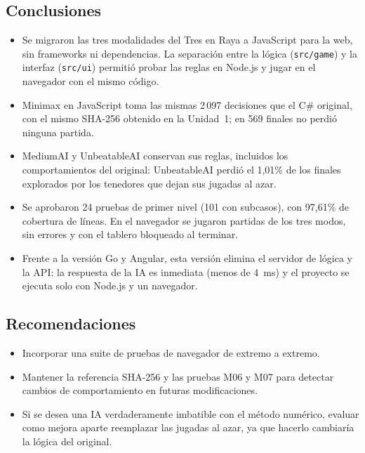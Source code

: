\documentclass[12pt,a4paper]{article}
\begin{document}
\subsection{Conclusiones}
\begin{itemize}
 \item Se migraron las tres modalidades del Tres en Raya a JavaScript para la web,
       sin frameworks ni dependencias. La separación entre la lógica
       (\texttt{src/game}) y la interfaz (\texttt{src/ui}) permitió probar las
       reglas en Node.js y jugar en el navegador con el mismo código.
 \item Minimax en JavaScript toma las mismas 2\,097 decisiones que el C\# original,
       con el mismo SHA-256 obtenido en la Unidad~1; en 569 finales no perdió ninguna partida.
 \item MediumAI y UnbeatableAI conservan sus reglas, incluidos los comportamientos
       del original: UnbeatableAI perdió el 1,01\% de los finales explorados por
       los tenedores que dejan sus jugadas al azar.
 \item Se aprobaron 24 pruebas de primer nivel (101 con subcasos), con 97,61\% de
       cobertura de líneas. En el navegador se jugaron partidas de los tres modos,
       sin errores y con el tablero bloqueado al terminar.
 \item Frente a la versión Go y Angular, esta versión elimina el servidor de
       lógica y la API: la respuesta de la IA es inmediata (menos de 4~ms) y
       el proyecto se ejecuta solo con Node.js y un navegador.
\end{itemize}

\subsection{Recomendaciones}
\begin{itemize}
 \item Incorporar una suite de pruebas de navegador de extremo a extremo.
 \item Mantener la referencia SHA-256 y las pruebas M06 y M07 para detectar
       cambios de comportamiento en futuras modificaciones.
 \item Si se desea una IA verdaderamente imbatible con el método numérico, evaluar
       como mejora aparte reemplazar las jugadas al azar, ya que hacerlo cambiaría
       la lógica del original.
\end{itemize}
\end{document}
